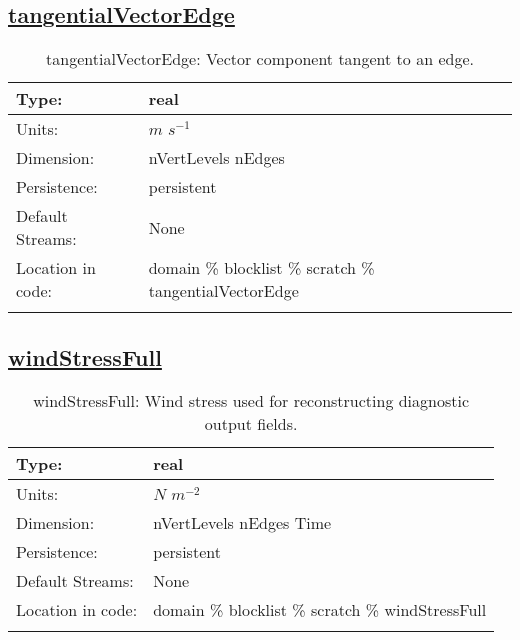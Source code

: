 \subsection[tangentialVectorEdge]{\hyperref[sec:var_tab_scratch]{tangentialVectorEdge}}
\label{subsec:var_sec_scratch_tangentialVectorEdge}
\begin{center}
\begin{longtable}{| p{2.0in} | p{4.0in} |}
        \hline 
        Type: & real \\
        \hline 
        Units: & $m$ $s^{-1}$ \\
        \hline 
        Dimension: & nVertLevels nEdges \\
        \hline 
        Persistence: & persistent \\
        \hline 
		 Default Streams: & None \\
        \hline 
		 Location in code: & domain \% blocklist \% scratch \% tangentialVectorEdge \\
		 \hline 
    \caption{tangentialVectorEdge: Vector component tangent to an edge.}
\end{longtable}
\end{center}
\subsection[windStressFull]{\hyperref[sec:var_tab_scratch]{windStressFull}}
\label{subsec:var_sec_scratch_windStressFull}
\begin{center}
\begin{longtable}{| p{2.0in} | p{4.0in} |}
        \hline 
        Type: & real \\
        \hline 
        Units: & $N$ $m^{-2}$ \\
        \hline 
        Dimension: & nVertLevels nEdges Time \\
        \hline 
        Persistence: & persistent \\
        \hline 
		 Default Streams: & None \\
        \hline 
		 Location in code: & domain \% blocklist \% scratch \% windStressFull \\
		 \hline 
    \caption{windStressFull: Wind stress used for reconstructing diagnostic output fields.}
\end{longtable}
\end{center}
